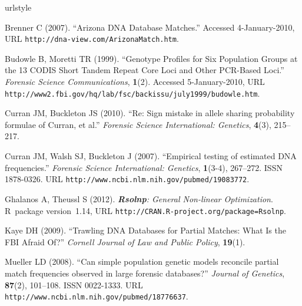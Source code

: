 \documentclass[a4paper,11pt]{article}
\newcommand{\proglang}[1]{\textsf{#1}}
\newcommand{\pkg}[1]{\textbf{#1}}
\begin{document}
\begin{thebibliography}{}
\newcommand{\enquote}[1]{``#1''}
\providecommand{\natexlab}[1]{#1}
\providecommand{\url}[1]{\texttt{#1}}
\providecommand{\urlprefix}{URL }
\expandafter\ifx\csname urlstyle\endcsname\relax
  \providecommand{\doi}[1]{doi:\discretionary{}{}{}#1}\else
  \providecommand{\doi}{doi:\discretionary{}{}{}\begingroup
  \urlstyle{rm}\Url}\fi
\providecommand{\eprint}[2][]{\url{#2}}

Brenner C (2007).
\newblock \enquote{Arizona {DNA} Database Matches.}
\newblock Accessed 4-January-2010,
  \urlprefix\url{http://dna-view.com/ArizonaMatch.htm}.

Budowle B, Moretti TR (1999).
\newblock \enquote{Genotype Profiles for Six Population Groups at the 13
  {CODIS} Short Tandem Repeat Core Loci and Other {PCR}-Based Loci.}
\newblock \emph{Forensic Science Communications}, \textbf{1}(2).
\newblock Accessed 5-January-2010,
  \urlprefix\url{http://www2.fbi.gov/hq/lab/fsc/backissu/july1999/budowle.htm}.

Curran JM, Buckleton JS (2010).
\newblock \enquote{Re: Sign mistake in allele sharing probability formulae of
  {C}urran, et al.}
\newblock \emph{Forensic Science International: Genetics}, \textbf{4}(3),
  215--217.

Curran JM, Walsh SJ, Buckleton J (2007).
\newblock \enquote{Empirical testing of estimated {DNA} frequencies.}
\newblock \emph{Forensic Science International: Genetics}, \textbf{1}(3-4),
  267--272.
\newblock ISSN 1878-0326.
\newblock \urlprefix\url{http://www.ncbi.nlm.nih.gov/pubmed/19083772}.

Ghalanos A, Theussl S (2012).
\newblock \emph{\pkg{Rsolnp}: General Non-linear Optimization}.
\newblock \proglang{R}~package version~1.14,
  \urlprefix\url{http://CRAN.R-project.org/package=Rsolnp}.

Kaye DH (2009).
\newblock \enquote{Trawling {DNA} Databases for Partial Matches: What Is the
  {FBI} Afraid Of?}
\newblock \emph{Cornell Journal of Law and Public Policy}, \textbf{19}(1).

Mueller LD (2008).
\newblock \enquote{Can simple population genetic models reconcile partial match
  frequencies observed in large forensic databases?}
\newblock \emph{Journal of Genetics}, \textbf{87}(2), 101--108.
\newblock ISSN 0022-1333.
\newblock \urlprefix\url{http://www.ncbi.nlm.nih.gov/pubmed/18776637}.


\end{thebibliography}
\end{document}
